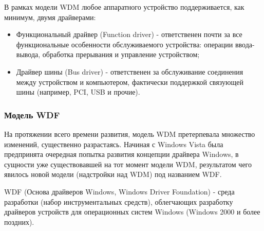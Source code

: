 \documentclass[14pt,a4paper]{article}
\begin{document}
В рамках модели WDM любое аппаратного устройство поддерживается, как минимум, двумя драйверами:

\begin{itemize}
\item Функциональный драйвер (Function driver) - ответственен почти за все функциональные особенности обслуживаемого устройства: операции ввода-вывода, обработка прерывания и управление устройством;
\item Драйвер шины (Bus driver) - ответственен за обслуживание соединения между устройством и компьютером, фактически поддержкой связующей шины (например, PCI, USB и прочие).
\end{itemize}

\subsubsection{Модель WDF}
На протяжении всего времени развития, модель WDM претерпевала множество изменений, существенно разрастаясь. Начиная с Windows Vista была предпринята очередная попытка развития концепции драйвера Windows, в сущности уже существовавшей на тот момент модели WDM, результатом чего явилось новой модели (надстройки над WDM) под названием WDF.

\par WDF (Основа драйверов Windows, Windows Driver Foundation) - среда разработки (набор инструментальных средств), облегчающих разработку драйверов устройств для операционных систем Windows (Windows 2000 и более поздних).\\
\end{document}

